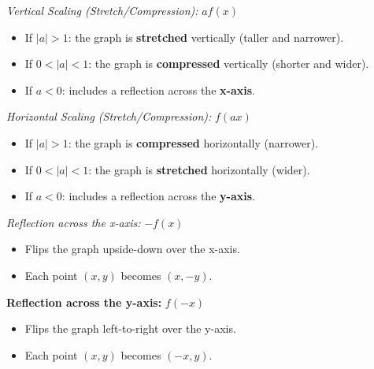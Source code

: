 	\emph{Vertical Scaling (Stretch/Compression):} \( a f(x) \)
	      \begin{itemize}[label=\(-\)]
		      \item If \( |a| > 1 \): the graph is \textbf{stretched} vertically (taller and narrower).
		      \item If \( 0 < |a| < 1 \): the graph is \textbf{compressed} vertically (shorter and wider).
		      \item If \( a < 0 \): includes a reflection across the \textbf{x-axis}.
	      \end{itemize}

	\emph{Horizontal Scaling (Stretch/Compression):} \( f(a x) \)
	      \begin{itemize}[label=\(-\)]
		      \item If \( |a| > 1 \): the graph is \textbf{compressed} horizontally (narrower).
		      \item If \( 0 < |a| < 1 \): the graph is \textbf{stretched} horizontally (wider).
		      \item If \( a < 0 \): includes a reflection across the \textbf{y-axis}.
	      \end{itemize}

	 \emph{Reflection across the x-axis:} \( -f(x) \)
	      \begin{itemize}[label=\(-\)]
		      \item Flips the graph upside-down over the x-axis.
		      \item Each point \( (x, y) \) becomes \( (x, -y) \).
	      \end{itemize}

	\textbf{Reflection across the y-axis:} \( f(-x) \)
	      \begin{itemize}[label=\(-\)]
		      \item Flips the graph left-to-right over the y-axis.
		      \item Each point \( (x, y) \) becomes \( (-x, y) \).
	      \end{itemize}

\newpage